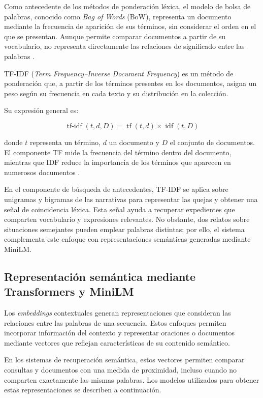 Como antecedente de los métodos de ponderación léxica, el modelo de bolsa de palabras, conocido como \textit{Bag of Words} (BoW), representa un documento mediante la frecuencia de aparición de sus términos, sin considerar el orden en el que se presentan. Aunque permite comparar documentos a partir de su vocabulario, no representa directamente las relaciones de significado entre las palabras \cite{manning2008ir}.

TF-IDF (\textit{Term Frequency--Inverse Document Frequency}) es un método de ponderación que, a partir de los términos presentes en los documentos, asigna un peso según su frecuencia en cada texto y su distribución en la colección.

Su expresión general es:

\begin{equation}
    \operatorname{tf-idf}(t,d,D)
    =
    \operatorname{tf}(t,d)
    \times
    \operatorname{idf}(t,D)
    \label{eq:tfidf}
\end{equation}

donde $t$ representa un término, $d$ un documento y $D$ el conjunto de documentos. El componente TF mide la frecuencia del término dentro del documento, mientras que IDF reduce la importancia de los términos que aparecen en numerosos documentos \cite{manning2008ir}.

En el componente de búsqueda de antecedentes, TF-IDF se aplica sobre unigramas y bigramas de las narrativas para representar las quejas y obtener una señal de coincidencia léxica. Esta señal ayuda a recuperar expedientes que comparten vocabulario y expresiones relevantes. No obstante, dos relatos sobre situaciones semejantes pueden emplear palabras distintas; por ello, el sistema complementa este enfoque con representaciones semánticas generadas mediante MiniLM.

\subsection{Representación semántica mediante Transformers y MiniLM}

Los \textit{embeddings} contextuales generan representaciones que consideran las relaciones entre las palabras de una secuencia. Estos enfoques permiten incorporar información del contexto y representar oraciones o documentos mediante vectores que reflejan características de su contenido semántico.

En los sistemas de recuperación semántica, estos vectores permiten comparar consultas y documentos con una medida de proximidad, incluso cuando no comparten exactamente las mismas palabras. Los modelos utilizados para obtener estas representaciones se describen a continuación.

